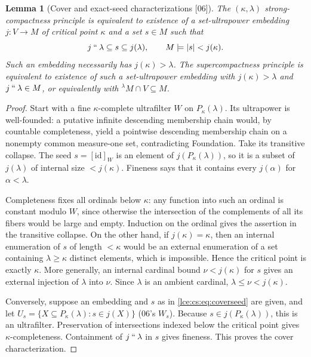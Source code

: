 \documentclass[11pt,letterpaper]{article}
\numberwithin{equation}{section}
\newtheorem{lemma}[theorem]{Lemma}
\theoremstyle{definition}
\theoremstyle{remark}
\newcommand{\imset}[2]{#1\mathbin{``}#2}
\newcommand{\abs}[1]{\lvert#1\rvert}
\newcommand{\src}[1]{\textup{\textsf{\small[#1]}}}%
\begin{document}
\begin{lemma}[Cover and exact-seed characterizations \src{06}]\label{lce:cs:lem:compact-seeds}
The $(\kappa,\lambda)$ strong-compactness principle is equivalent to
existence of a set-ultrapower embedding $j:V\to M$ of critical point
$\kappa$ and a set $s\in M$ such that
\begin{equation}\label{lce:cs:eq:coverseed}
 \imset j\lambda\subseteq s\subseteq j(\lambda),
 \qquad M\models\abs s<j(\kappa).
\end{equation}
Such an embedding necessarily has $j(\kappa)>\lambda$. The supercompactness
principle is equivalent to existence of such a set-ultrapower embedding with
$j(\kappa)>\lambda$ and $\imset j\lambda\in M$, or equivalently with
${}^{\lambda}M\cap V\subseteq M$.
\end{lemma}
\begin{proof}
Start with a fine $\kappa$-complete ultrafilter $W$ on $P_\kappa(\lambda)$.
Its ultrapower is well-founded: a putative infinite descending membership
chain would, by countable completeness, yield a pointwise descending
membership chain on a nonempty common measure-one set, contradicting
Foundation. Take its transitive collapse. The seed $s=[\mathrm{id}]_W$ is an
element of $j(P_\kappa(\lambda))$, so it is a subset of $j(\lambda)$ of
internal size $<j(\kappa)$. Fineness says that it contains every $j(\alpha)$
for $\alpha<\lambda$.

Completeness fixes all ordinals below $\kappa$: any function into such an
ordinal is constant modulo $W$, since otherwise the intersection of the
complements of all its fibers would be large and empty. Induction on the
ordinal gives the assertion in the transitive collapse. On the other hand,
if $j(\kappa)=\kappa$, then an internal enumeration of $s$ of length
$<\kappa$ would be an external enumeration of a set containing
$\lambda\ge\kappa$ distinct elements, which is impossible. Hence the
critical point is exactly $\kappa$. More generally, an internal cardinal
bound $\nu<j(\kappa)$ for $s$ gives an external injection of $\lambda$ into
$\nu$. Since $\lambda$ is an ambient cardinal, $\lambda\le\nu<j(\kappa)$.

Conversely, suppose an embedding and $s$ as in \eqref{lce:cs:eq:coverseed}
are given, and let $U_s=\{X\subseteq P_\kappa(\lambda):s\in j(X)\}$ (06's
$W_s$). Because $s\in j(P_\kappa(\lambda))$, this is an ultrafilter.
Preservation of intersections indexed below the critical point gives
$\kappa$-completeness. Containment of $\imset j\lambda$ in $s$ gives
fineness. This proves the cover characterization.


\end{proof}
\end{document}
